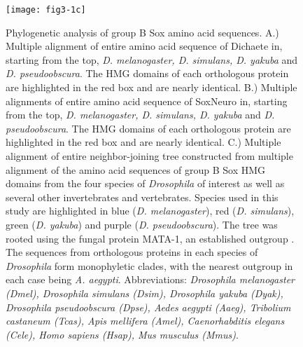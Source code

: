 \begin{figure}[H]
\centering
\texttt{[image: fig3-1c]}
\caption[Phylogenetic analysis of group B Sox amino acid sequences]{Phylogenetic analysis of group B Sox amino acid sequences. A.) Multiple alignment of entire amino acid sequence of Dichaete in, starting from the top, \emph{D. melanogaster, D. simulans, D. yakuba} and \emph{D. pseudoobscura}. The HMG domains of each orthologous protein are highlighted in the red box and are nearly identical. B.) Multiple alignments of entire amino acid sequence of SoxNeuro in, starting from the top, \emph{D. melanogaster, D. simulans, D. yakuba} and \emph{D. pseudoobscura}. The HMG domains of each orthologous protein are highlighted in the red box and are nearly identical. C.) Multiple alignment of entire neighbor-joining tree constructed from multiple alignment of the amino acid sequences of group B Sox HMG domains from the four species of \emph{Drosophila} of interest as well as several other invertebrates and vertebrates. Species used in this study are highlighted in blue (\emph{D. melanogaster}), red (\emph{D. simulans}), green (\emph{D. yakuba}) and purple (\emph{D. pseudoobscura}). The tree was rooted using the fungal protein MATA-1, an established outgroup \citep{laudet_ancestry_1993}. The sequences from orthologous proteins in each species of \emph{Drosophila} form monophyletic clades, with the nearest outgroup in each case being \emph{A. aegypti}. Abbreviations: \emph{Drosophila melanogaster (Dmel), Drosophila simulans (Dsim), Drosophila yakuba (Dyak), Drosophila pseudoobscura (Dpse), Aedes aegypti (Aaeg), Tribolium castaneum (Tcas), Apis mellifera (Amel), Caenorhabditis elegans (Cele), Homo sapiens (Hsap), Mus musculus (Mmus)}.}
\label{Figure 3.1}
\end{figure}

